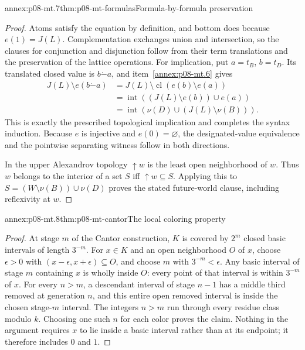 \begin{annexitem}{annex:p08-mt.7}{thm:p08-mt-formulas}{Formula-by-formula preservation}
\begin{proof}
Atoms satisfy the equation by definition, and bottom does because
\(e(1)=J(L)\). Complementation exchanges union and intersection, so
the clauses for conjunction and disjunction follow from their term
translations and the preservation of the lattice operations. For implication,
put \(a=t_B\), \(b=t_D\). Its translated closed value is
\(b\mathbin{\dot{-}}a\), and item~\ref{annex:p08-mt.6} gives
\[
 \begin{split}
 J(L)\setminus e(b\mathbin{\dot{-}}a)
 &=J(L)\setminus\operatorname{cl}(e(b)\setminus e(a))\\
 &=\operatorname{int}((J(L)\setminus e(b))\cup e(a))\\
 &=\operatorname{int}(\nu(D)\cup(J(L)\setminus\nu(B))).
 \end{split}
\]
This is exactly the prescribed topological implication and completes
the syntax induction. Because \(e\) is injective and \(e(0)=\varnothing\),
the designated-value equivalence and the pointwise separating witness
follow in both directions.

In the upper Alexandrov topology \(\uparrow w\) is the least open
neighborhood of \(w\). Thus \(w\) belongs to the interior of a set
\(S\) iff \(\uparrow w\subseteq S\). Applying this to
\(S=(W\setminus\nu(B))\cup\nu(D)\) proves the stated future-world
clause, including reflexivity at \(w\).
\end{proof}
\end{annexitem}

\begin{annexitem}{annex:p08-mt.8}{thm:p08-mt-cantor}{The local coloring property}
\begin{proof}
At stage \(m\) of the Cantor construction, \(K\) is covered by
\(2^m\) closed basic intervals of length \(3^{-m}\). For \(x\in K\)
and an open neighborhood \(O\) of \(x\), choose \(\epsilon>0\) with
\((x-\epsilon,x+\epsilon)\subseteq O\), and choose \(m\) with
\(3^{-m}<\epsilon\). Any basic interval of stage \(m\) containing
\(x\) is wholly inside \(O\): every point of that interval is within
\(3^{-m}\) of \(x\). For every \(n>m\), a descendant interval of
stage \(n-1\) has a middle third removed at generation \(n\), and
this entire open removed interval is inside the chosen stage-\(m\)
interval. The integers \(n>m\) run through every residue class modulo
\(k\). Choosing one such \(n\) for each color proves the claim.
Nothing in the argument requires \(x\) to lie inside a basic interval
rather than at its endpoint; it therefore includes \(0\) and \(1\).
\end{proof}
\end{annexitem}

